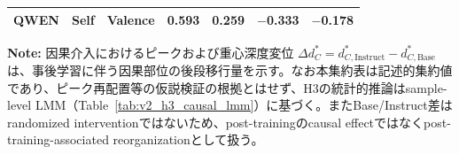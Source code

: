 \begin{table}[htbp]
\begin{tabular}{lll cccc}
QWEN       & Self     & Valence  & 0.593          & 0.259            & $-$0.333   & $-$0.178   \\
\bottomrule
\end{tabular}
\vspace{1ex}
\begin{minipage}{\linewidth}
\footnotesize
\textbf{Note:} 因果介入におけるピークおよび重心深度変位 $\Delta d_C^* = d_{C,\text{Instruct}}^* - d_{C,\text{Base}}^*$ は、事後学習に伴う因果部位の後段移行量を示す。なお本集約表は記述的集約値であり、ピーク再配置等の仮説検証の根拠とはせず、H3の統計的推論はsample-level LMM（Table~\ref{tab:v2_h3_causal_lmm}）に基づく。またBase/Instruct差はrandomized interventionではないため、post-trainingのcausal effectではなくpost-training-associated reorganizationとして扱う。
\end{minipage}
\end{table}